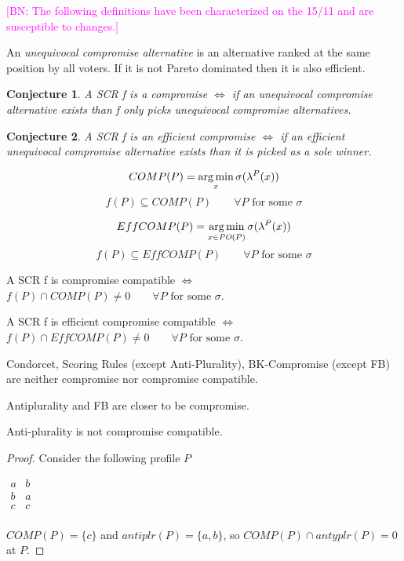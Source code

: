 \documentclass[version=3.21, pagesize, notitlepage, twoside=off, bibliography=totoc, DIV=calc, fontsize=12pt, a4paper]{scrartcl}
\newtheorem{conjecture}{Conjecture}[section]
\newcommand{\commentBN}[1]{\textcolor{magenta}{\small$\big[$BN: #1$\big]$}}
\newcommand{\paretopt}{\mathit{PO}}
\begin{document}
\commentBN{The following definitions have been characterized on the 15/11 and are susceptible to changes.}
\begin{definition}
	An \textit{unequivocal compromise alternative} is an alternative ranked at the same position by all voters. If it is not Pareto dominated then it is also efficient.
\end{definition}
\begin{conjecture}
	A SCR f is a compromise $\iff$ if an unequivocal compromise alternative exists than f only picks unequivocal compromise alternatives.
\end{conjecture}
\begin{conjecture}
	A SCR f is an efficient compromise $\iff$ if an efficient unequivocal compromise alternative exists than it is picked as a sole winner.
\end{conjecture}
\begin{definition}[Compromise]
	\[ COMP(P) = \operatorname*{arg\,min}_x \sigma(\lambda^P(x)) \]
	\[f(P) \subseteq COMP(P) \qquad \forall P \text{ for some } \sigma\]
\end{definition}
\begin{definition}
	\[ EffCOMP(P) = \argmin_{x \in \paretopt(P)} \sigma(\lambda^P(x)) \]
	\[f(P) \subseteq EffCOMP(P) \qquad \forall P \text{ for some } \sigma\]
\end{definition}
\begin{definition}
	A SCR f is compromise compatible $\iff$
	$f(P) \cap COMP(P) \neq 0 \qquad \forall P \text{ for some } \sigma$.
\end{definition}
\begin{definition}
	A SCR f is efficient compromise compatible $\iff$
	$f(P) \cap EffCOMP(P) \neq 0 \qquad \forall P \text{ for some } \sigma$.
\end{definition}
\begin{proposition}
	Condorcet, Scoring Rules (except Anti-Plurality), BK-Compromise (except FB) are neither compromise nor compromise compatible.
\end{proposition}

Antiplurality and FB are closer to be compromise.

\begin{proposition}
	Anti-plurality is not compromise compatible.
\end{proposition}
\begin{proof} Consider the following profile $P$
	\begin{center}
		$
		\begin{array}{cc}
		a&b\\
		b&a\\
		c&c\\
		\end{array}
		$
	\end{center}
	$COMP(P)=\{c\}$ and $\textit{antiplr}(P)=\{a,b\}$, so $COMP(P) \cap \textit{antyplr}(P)=0$ at $P$.
\end{proof}
\end{document}
